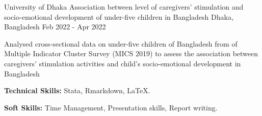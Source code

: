 

\begin{cventries}

  \cventry
    {University of Dhaka} %
    {Association between level of caregivers’ stimulation and socio-emotional development of under-five children in Bangladesh} %
    {Dhaka, Bangladesh} %
    {Feb 2022 - Apr 2022} %
    {
      \begin{cvitems} %
        \item {Analysed cross-sectional data on under-five children of Bangladesh from of Multiple Indicator Cluster Survey (MICS 2019) to assess the association between caregivers’ stimulation activities and child’s socio-emotional development in Bangladesh}
        \item {\textbf{Technical Skills:} Stata, Rmarkdown, LaTeX.}
        \item {\textbf{Soft Skills:} Time Management, Presentation skills, Report writing.}
      \end{cvitems}
    }

\end{cventries}

